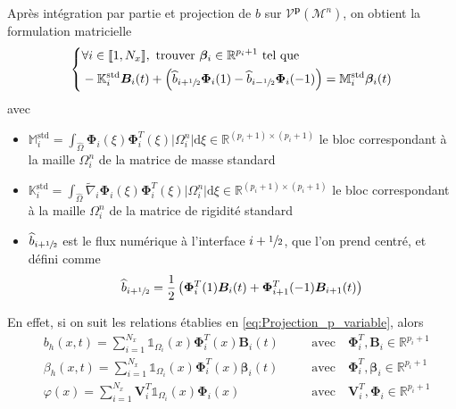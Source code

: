 \documentclass[11pt, a4paper, oneside]{report}
\begin{document}
Après intégration par partie et projection de $b$ sur $\mathcal{V}^\mathbf{p}(\mathcal{M}^n)$, on obtient la formulation matricielle
\begin{equation} \label{eq:Probleme_matriciel_beta_1D}
    \left \{
    \begin{aligned}
        &\forall i \in \llbracket 1, N_x \rrbracket, \text{ trouver } \bm{\beta}_i \in \mathbb{R}^{p_i+1} \text{ tel que} \\
        &-\mathbb{K}_i^\text{std} \bm{B}_i(t) + \left( \widehat{b}_{i+\sfrac{1}{2}} \bm{\Phi}_i(1) - \widehat{b}_{i-\sfrac{1}{2}} \bm{\Phi}_i(-1) \right) = \mathbb{M}_i^\text{std} \bm{\beta}_i(t) \\
    \end{aligned}
    \right.
\end{equation}
avec
\begin{itemize}
    \item $\displaystyle \mathbb{M}_i^\text{std} = \int_{\widehat{\Omega}} \bm{\Phi}_i(\xi) \bm{\Phi}_i^T(\xi) \lvert \Omega_i^n \rvert \text{d}\xi \in \mathbb{R}^{(p_i+1) \times (p_i+1)}$ le bloc correspondant à la maille $\Omega_i^n$ de la matrice de masse standard
    \item $\displaystyle \mathbb{K}_i^\text{std} = \int_{\widehat{\Omega}} \widetilde{\nabla}_i \bm{\Phi}_i(\xi) \bm{\Phi}_i^T(\xi) \lvert \Omega_i^n \rvert \text{d}\xi \in \mathbb{R}^{(p_i+1) \times (p_i+1)}$ le bloc correspondant à la maille $\Omega_i^n$ de la matrice de rigidité standard
    \item $\widehat{b}_{i+\sfrac{1}{2}}$ est le flux numérique à l'interface $i+\sfrac{1}{2}$, que l'on prend centré, et défini comme
    \begin{equation}
        \widehat{b}_{i+\sfrac{1}{2}} = \frac{1}{2} \left( \bm{\Phi}_i^T(1) \bm{B}_i(t) + \bm{\Phi}_{i+1}^T(-1) \bm{B}_{i+1}(t) \right)
    \end{equation}
\end{itemize}
En effet, si on suit les relations établies en \eqref{eq:Projection_p_variable}, alors
\begin{equation} \label{eq:Projection_exner_1D}
    \begin{aligned}
        &b_h(x, t) = \sum_{i = 1}^{N_x} \mathds{1}_{\Omega_i}(x) \bm{\Phi}_i^T(x) \bm{B}_i(t) \quad &&\text{avec} \quad \bm{\Phi}_i^T, \bm{B}_i \in \mathbb{R}^{p_i + 1} \\
        &\beta_h(x, t) = \sum_{i = 1}^{N_x} \mathds{1}_{\Omega_i}(x) \bm{\Phi}_i^T(x) \bm{\beta}_i(t) \quad &&\text{avec} \quad \bm{\Phi}_i^T, \bm{\beta}_i \in \mathbb{R}^{p_i + 1} \\
        &\varphi(x) = \sum_{i = 1}^{N_x} \bm{V}_i^T \mathds{1}_{\Omega_i}(x) \bm{\Phi}_i(x) \quad &&\text{avec} \quad \bm{V}_i^T, \bm{\Phi}_i \in \mathbb{R}^{p_i + 1}
    \end{aligned}
\end{equation}
\end{document}
